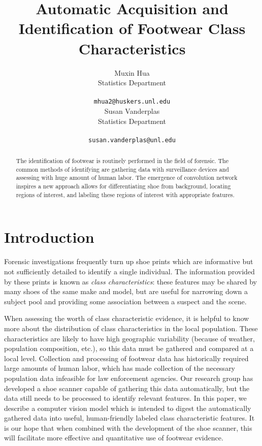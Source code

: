 \documentclass[10pt]{article}
\author{Muxin Hua\\
  Statistics Department\\ \\ 
{\tt mhua2@huskers.unl.edu}\\\And Susan Vanderplas\\
  Statistics Department\\ \\ 
{\tt susan.vanderplas@unl.edu}\\}
\title{Automatic Acquisition and Identification of Footwear Class
Characteristics}
\date{}
\newcommand{\svp}[1]{{\textcolor{RedOrange}{#1}}}
\begin{document}
\maketitle
\begin{abstract}
The identification of footwear is routinely performed in the field of
forensic. The common methods of identifying are gathering data with
surveillance devices and assessing with huge amount of human labor. The
emergence of convolution network inspires a new approach allows for
differentiating shoe from background, locating regions of interest, and
labeling these regions of interest with appropriate features.
\end{abstract}


\section{Introduction}
\svp{Forensic investigations frequently turn up shoe prints which are informative but not sufficiently detailed to identify a single individual. The information provided by these prints is known as \emph{class characteristics}: these features may be shared by many shoes of the same make and model, but are useful for narrowing down a subject pool and providing some association between a suspect and the scene.}


\svp{When assessing the worth of class characteristic evidence, it is helpful to know more about the distribution of class characteristics in the local population. These characteristics are likely to have high geographic variability (because of weather, population composition, etc.), so this data must be gathered and compared at a local level. Collection and processing of footwear data has historically required large amounts of human labor, which has made collection of the necessary population data infeasible for law enforcement agencies. Our research group has developed a shoe scanner capable of gathering this data automatically, but the data still needs to be processed to identify relevant features. In this paper, we describe a computer vision model which is intended to digest the automatically gathered data into useful, human-friendly labeled class characteristic features. It is our hope that when combined with the development of the shoe scanner, this will facilitate more effective and quantitative use of footwear evidence.}
\end{document}
